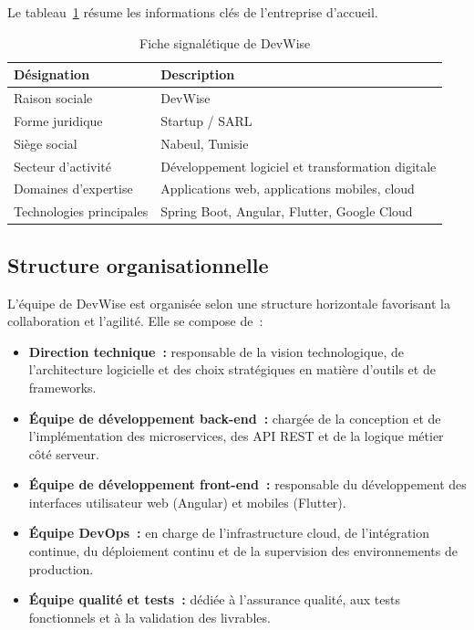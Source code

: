 Le tableau~\ref{tab:fiche-signaletique} résume les informations clés de l'entreprise d'accueil.

\begin{table}[H]
\centering
\caption{Fiche signalétique de DevWise}
\label{tab:fiche-signaletique}
\begin{tabular}{|l|l|}
\hline
\rowcolor{gray!20}
\textbf{Désignation} & \textbf{Description} \\
\hline
Raison sociale & DevWise \\
\hline
Forme juridique & Startup / SARL \\
\hline
Siège social & Nabeul, Tunisie \\
\hline
Secteur d'activité & Développement logiciel et transformation digitale \\
\hline
Domaines d'expertise & Applications web, applications mobiles, cloud \\
\hline
Technologies principales & Spring Boot, Angular, Flutter, Google Cloud \\
\hline
\end{tabular}
\end{table}

\subsection{Structure organisationnelle}
\label{subsec:structure-organisationnelle}

L'équipe de DevWise est organisée selon une structure horizontale favorisant la collaboration et l'agilité. Elle se compose de~:

\begin{itemize}
    \item \textbf{Direction technique~:} responsable de la vision technologique, de l'architecture logicielle et des choix stratégiques en matière d'outils et de frameworks.
    \item \textbf{Équipe de développement back-end~:} chargée de la conception et de l'implémentation des microservices, des API REST et de la logique métier côté serveur.
    \item \textbf{Équipe de développement front-end~:} responsable du développement des interfaces utilisateur web (Angular) et mobiles (Flutter).
    \item \textbf{Équipe DevOps~:} en charge de l'infrastructure cloud, de l'intégration continue, du déploiement continu et de la supervision des environnements de production.
    \item \textbf{Équipe qualité et tests~:} dédiée à l'assurance qualité, aux tests fonctionnels et à la validation des livrables.
\end{itemize}


